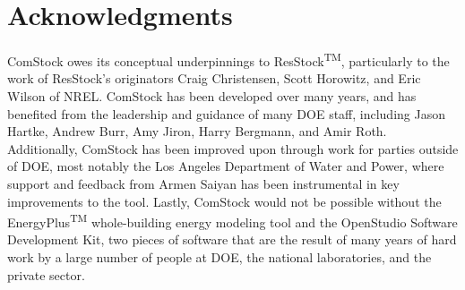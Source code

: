 \chapter{Acknowledgments}
ComStock owes its conceptual underpinnings to ResStock\textsuperscript{TM}, particularly to the work of ResStock's originators Craig Christensen, Scott Horowitz, and Eric Wilson of NREL. ComStock has been developed over many years, and has benefited from the leadership and guidance of many DOE staff, including Jason Hartke, Andrew Burr, Amy Jiron, Harry Bergmann, and Amir Roth. Additionally, ComStock has been improved upon through work for parties outside of DOE, most notably the Los Angeles Department of Water and Power, where support and feedback from Armen Saiyan has been instrumental in key improvements to the tool. Lastly, ComStock would not be possible without the EnergyPlus\textsuperscript{TM} whole-building energy modeling tool and the OpenStudio\textsuperscript{\textregistered} Software Development Kit, two pieces of software that are the result of many years of hard work by a large number of people at DOE, the national laboratories, and the private sector.